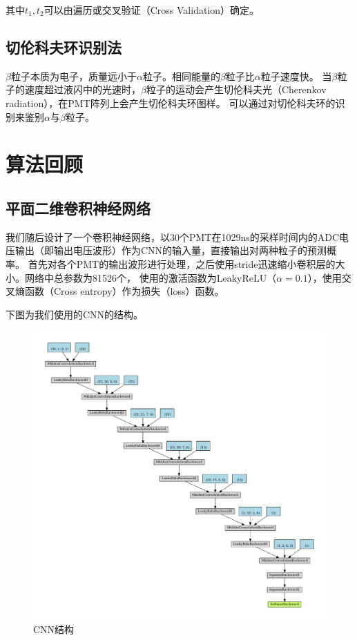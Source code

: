 \documentclass{ctexart}
\begin{document}
其中$t_{1},t_{2}$可以由遍历或交叉验证（Cross Validation）确定。

\subsection{切伦科夫环识别法}
$\beta$粒子本质为电子，质量远小于$\alpha$粒子。相同能量的$\beta$粒子比$\alpha$粒子速度快。
当$\beta$粒子的速度超过液闪中的光速时，$\beta$粒子的运动会产生切伦科夫光（Cherenkov radiation），在PMT阵列上会产生切伦科夫环图样。
可以通过对切伦科夫环的识别来鉴别$\alpha$与$\beta$粒子。

\section{算法回顾}
\subsection{平面二维卷积神经网络} %
\label{sub:平面二维卷积神经网络}
我们随后设计了一个卷积神经网络，以30个PMT在1029ns的采样时间内的ADC电压输出（即输出电压波形）作为CNN的输入量，直接输出对两种粒子的预测概率。
首先对各个PMT的输出波形进行处理，之后使用stride迅速缩小卷积层的大小。网络中总参数为81526个，
使用的激活函数为LeakyReLU（$\alpha=0.1$），使用交叉熵函数（Cross entropy）作为损失（loss）函数。


下图为我们使用的CNN的结构。

\begin{figure}[H]
    \centering
    \includegraphics[width=1.0\linewidth]{net.pdf}
    \caption{CNN结构}
\end{figure}
\end{document}
